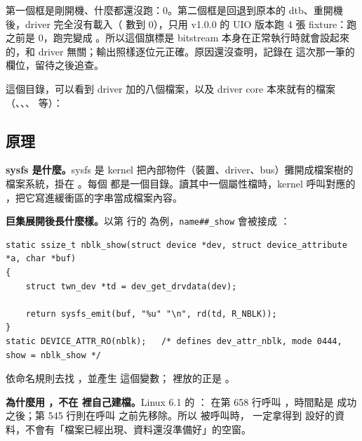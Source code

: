 
第一個框是剛開機、什麼都還沒跑：0。第二個框是回退到原本的 dtb、重開機後，driver 完全沒有載入（ 數到 0），只用 v1.0.0 的 UIO 版本跑 4 張 fixture：跑之前是 0，跑完變成 。所以這個旗標是 bitstream 本身在正常執行時就會設起來的，和 driver 無關；輸出照樣逐位元正確。原因還沒查明，記錄在  這次那一筆的  欄位，留待之後追查。

 這個目錄，可以看到 driver 加的八個檔案，以及 driver core 本來就有的檔案（、、、 等）：


\subsection{原理}

\textbf{sysfs 是什麼。}sysfs 是 kernel 把內部物件（裝置、driver、bus）攤開成檔案樹的檔案系統，掛在 。每個  都是一個目錄。讀其中一個屬性檔時，kernel 呼叫對應的 ，把它寫進緩衝區的字串當成檔案內容。

\textbf{巨集展開後長什麼樣。}以第  行的  為例，\texttt{name\#\#\_show} 會被接成 ：

\begin{lstlisting}[numbers=none,xleftmargin=0pt,title={\scriptsize 巨集展開後的樣子（示意，不是原始檔的內容）}]
static ssize_t nblk_show(struct device *dev, struct device_attribute *a, char *buf)
{
	struct twn_dev *td = dev_get_drvdata(dev);

	return sysfs_emit(buf, "%u" "\n", rd(td, R_NBLK));
}
static DEVICE_ATTR_RO(nblk);   /* defines dev_attr_nblk, mode 0444, show = nblk_show */
\end{lstlisting}

 依命名規則去找 ，並產生  這個變數； 裡放的正是 。

\textbf{為什麼用 ，不在  裡自己建檔。}Linux 6.1 的 ： 在第 658 行呼叫 ，時間點是  成功之後；第 545 行則在呼叫  之前先移除。所以  被呼叫時， 一定拿得到  設好的資料，不會有「檔案已經出現、資料還沒準備好」的空窗。

